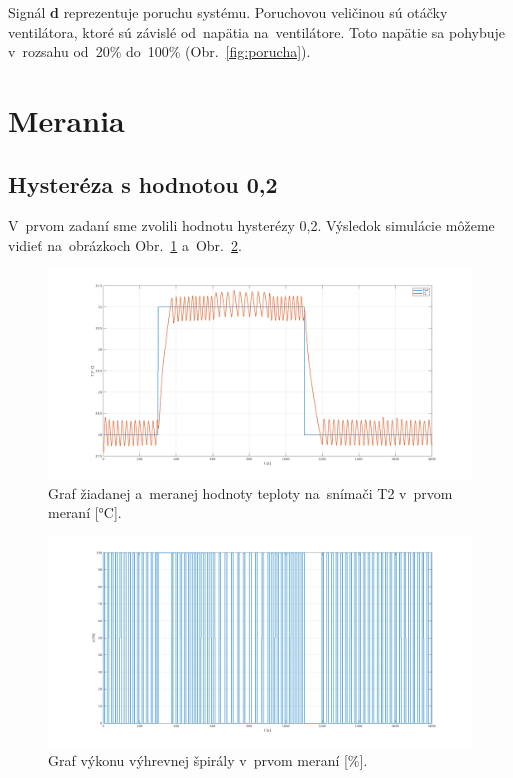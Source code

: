 \documentclass{article}
\begin{document}
Signál \textbf{d} reprezentuje poruchu systému. Poruchovou veličinou sú otáčky ventilátora, ktoré sú závislé
od~napätia na~ventilátore. Toto napätie sa pohybuje v~rozsahu od~20\% do~100\% (Obr.~\ref{fig:porucha}).

\section{Merania}
\label{sec:merania}

\subsection{Hysteréza s hodnotou 0,2}
\label{sec:meranie1}

V~prvom zadaní sme zvolili hodnotu hysterézy 0,2. Výsledok simulácie môžeme vidieť na~obrázkoch
Obr.~\ref{fig:m1t2} a~Obr.~\ref{fig:m1u}.

\begin{figure}[!htbp]
	\begin{center}
		\includegraphics[width=\textwidth]{./include/m1T2.png}
	\end{center}
	\caption{Graf žiadanej a~meranej hodnoty teploty na~snímači T2 v~prvom meraní [°C].}
	\label{fig:m1t2}
\end{figure}

\clearpage

\begin{figure}[!htbp]
	\begin{center}
		\includegraphics[width=\textwidth]{./include/m1u.png}
	\end{center}
	\caption{Graf výkonu výhrevnej špirály v~prvom meraní [\%].}
	\label{fig:m1u}
\end{figure}
\end{document}
